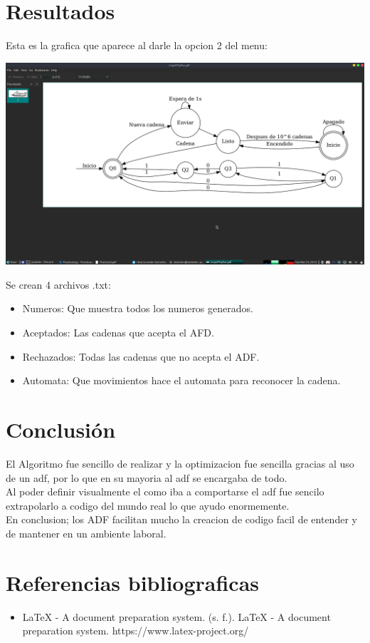 \documentclass{article}
\begin{document}
\section{Resultados}

Esta es la grafica que aparece al darle la opcion 2 del menu:
\begin{center}
    \includegraphics[width=\textwidth]{Grafica.png}
\end{center}
Se crean 4 archivos .txt:
\begin{itemize}
    \item Numeros: Que muestra todos los numeros generados.
    \item Aceptados: Las cadenas que acepta el AFD.
    \item Rechazados: Todas las cadenas que no acepta el ADF.
    \item Automata: Que movimientos hace el automata para reconocer la cadena.
\end{itemize}

\section{Conclusión}
El Algoritmo fue sencillo de realizar y la optimizacion fue sencilla gracias al uso de un adf, por lo que en su mayoria al adf se encargaba de todo.
\\Al poder definir visualmente el como iba a comportarse el adf fue sencilo extrapolarlo a codigo del mundo real lo que ayudo enormemente.
\\En conclusion; los ADF facilitan mucho la creacion de codigo facil de entender y de mantener en un ambiente laboral.

\section{Referencias bibliograficas}
\begin{itemize}
    \item LaTeX - A document preparation system. (s. f.). LaTeX - A document preparation system. https://www.latex-project.org/
\end{itemize}
\end{document}
